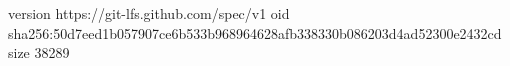 version https://git-lfs.github.com/spec/v1
oid sha256:50d7eed1b057907ce6b533b968964628afb338330b086203d4ad52300e2432cd
size 38289
